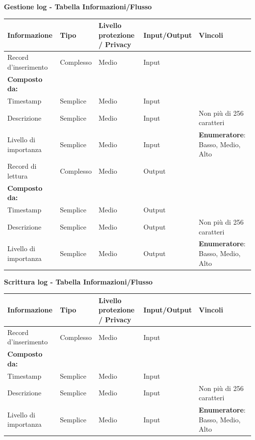 \documentclass[a4paper]{article}
\begin{document}
\textbf{Gestione log  - Tabella Informazioni/Flusso}

\begin{center}
    \begin{tabularx}{1\textwidth}{|X|X|X|X|X|}
        \hline
        \textbf{Informazione} &\textbf{Tipo} & \textbf{Livello protezione / Privacy} & \textbf{Input/Output} & \textbf{Vincoli}\\
        \hline
        \hline
        Record d'inserimento & Complesso & Medio & Input & \\
        \textbf{Composto da:} & & & & \\
        Timestamp & Semplice & Medio & Input & \\
        Descrizione & Semplice & Medio & Input & Non più di 256 caratteri \\
        Livello di importanza & Semplice & Medio & Input & \textbf{Enumeratore}: Basso, Medio, Alto\\
        \hline
        Record di lettura & Complesso & Medio & Output & \\
        \textbf{Composto da:} & & & & \\
        Timestamp & Semplice & Medio & Output & \\
        Descrizione & Semplice & Medio & Output & Non più di 256 caratteri \\
        Livello di importanza & Semplice & Medio & Output & \textbf{Enumeratore}: Basso, Medio, Alto\\
        \hline
    \end{tabularx}
\end{center}

\textbf{Scrittura log  - Tabella Informazioni/Flusso}

\begin{center}
    \begin{tabularx}{1\textwidth}{|X|X|X|X|X|}
        \hline
        \textbf{Informazione} &\textbf{Tipo} & \textbf{Livello protezione / Privacy} & \textbf{Input/Output} & \textbf{Vincoli}\\
        \hline
        \hline
        Record d'inserimento & Complesso & Medio & Input & \\
        \textbf{Composto da:} & & & & \\
        Timestamp & Semplice & Medio & Input & \\
        Descrizione & Semplice & Medio & Input & Non più di 256 caratteri \\
        Livello di importanza & Semplice & Medio & Input & \textbf{Enumeratore}: Basso, Medio, Alto\\
        \hline
    \end{tabularx}
\end{center}
\end{document}
